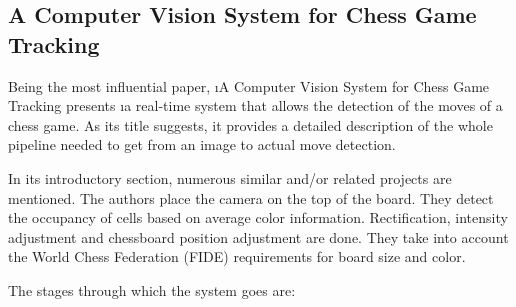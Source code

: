 
\subsection{A Computer Vision System for Chess Game Tracking} \label{subsec:a-computer-vision-system-for-chess-game-tracking}

Being the most influential paper, \i{A Computer Vision System for Chess Game Tracking}\cite{acvsystem} presents \i{a real-time system that allows the detection of the moves of a chess game}. As its title suggests, it provides a detailed description of the whole pipeline needed to get from an image to actual move detection. 

In its introductory section, numerous similar and/or related projects are mentioned. The authors place the camera on the top of the board. They detect the occupancy of cells based on average color information. Rectification, intensity adjustment and chessboard position adjustment are done. They take into account the World Chess Federation (FIDE) requirements for board size and color. 

The stages through which the system goes are:

